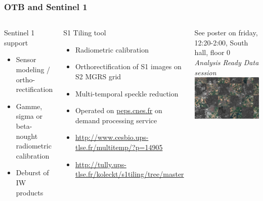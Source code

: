 \documentclass[8pt,aspectratio=169]{beamer}
\begin{document}
\begin{frame}
  \frametitle{OTB and Sentinel 1}
  \begin{columns}
    \begin{block}{Sentinel 1 support}
      \begin{itemize}
      \item Sensor modeling / ortho-rectification
      \item Gamme, sigma or beta-nought radiometric calibration
      \item Deburst of IW products
      \end{itemize}
    \end{block}

    \begin{block}{S1 Tiling tool}
      \begin{itemize}
      \item Radiometric calibration
      \item Orthorectification of S1 images on S2 MGRS grid
      \item Multi-temporal speckle reduction
      \item Operated on \url{peps.cnes.fr} on demand processing service
      \item \small{\url{http://www.cesbio.ups-tlse.fr/multitemp/?p=14905}}
      \item \small{\url{http://tully.ups-tlse.fr/koleckt/s1tiling/tree/master}}
      \end{itemize}
      \end{block}

    \begin{center}

      \small{See poster on friday, 12:20-2:00, South hall, floor 0\\ \emph{Analysis Ready Data session}}\\
      \vspace{0.5cm}
      \includegraphics[width=\textwidth]{s1_s2.png}
    \end{center}
  \end{columns}
    
    
    \end{frame}
\end{document}
